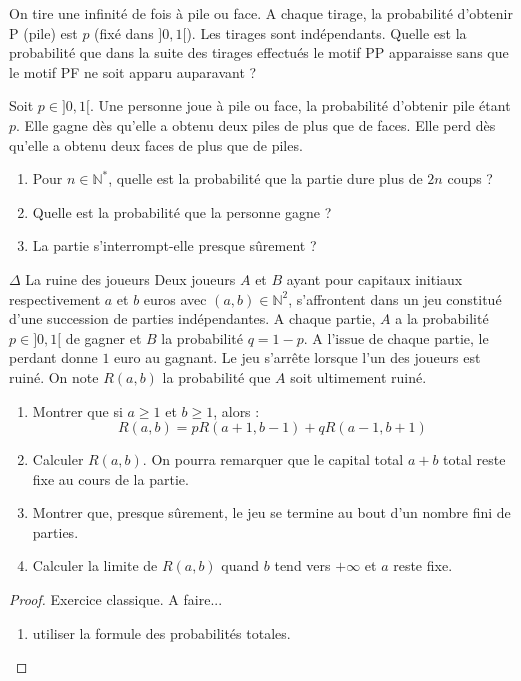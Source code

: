 \documentclass[french,a4paper]{article}
\newcommand{\N}{\mathbb{N}}
\newcommand{\st}{^*}
\theoremstyle{plain}
\theoremstyle{definition}
\theoremstyle{remark}
\begin{document}
\begin{ex}{}
	On tire une infinité de fois à pile ou face. A chaque tirage, la probabilité d'obtenir P (pile) est $p$ (fixé dans $]0,1[$). Les tirages sont indépendants. Quelle est la probabilité que dans la suite des tirages effectués le motif PP apparaisse sans que le motif PF ne soit apparu auparavant ?
\end{ex}

\begin{ex}{}
	Soit $p\in]0,1[$. Une personne joue à pile ou face, la probabilité d'obtenir pile étant $p$. Elle gagne dès qu'elle a obtenu deux piles de plus que de faces. Elle perd dès qu'elle a obtenu deux faces de plus que de piles.
	\begin{enumerate}
		\item Pour $n\in\N\st$, quelle est la probabilité que la partie dure plus de $2n$ coups ?
		\item Quelle est la probabilité que la personne gagne ?
		\item La partie s'interrompt-elle presque sûrement ?
	\end{enumerate}
\end{ex}

\begin{ex}{$\Delta$ La ruine des joueurs}
	Deux joueurs $A$ et $B$ ayant pour capitaux initiaux respectivement $a$ et $b$ euros avec $(a,b)\in\N^2$, s'affrontent dans un jeu constitué d'une succession de parties indépendantes. A chaque partie, $A$ a la probabilité $p\in]0,1[$ de gagner et $B$ la probabilité $q=1-p$. A l'issue de chaque partie, le perdant donne $1$ euro au gagnant. Le jeu s'arrête lorsque l'un des joueurs est ruiné. On note $R(a,b)$ la probabilité que $A$ soit ultimement ruiné.
	\begin{enumerate}
		\item Montrer que si $a\geqslant 1$ et $b\geqslant 1$, alors : $$R(a,b)=pR(a+1,b-1)+qR(a-1,b+1)$$
		\item Calculer $R(a,b)$. On pourra remarquer que le capital total $a+b$ total reste fixe au cours de la partie.
		\item Montrer que, presque sûrement, le jeu se termine au bout d'un nombre fini de parties.
		\item Calculer la limite de $R(a,b)$ quand $b$ tend vers $+\infty$ et $a$ reste fixe.
	\end{enumerate}
\end{ex}
\begin{proof}
	Exercice classique. A faire...
	\begin{enumerate}
		\item utiliser la formule des probabilités totales.
	\end{enumerate}
\end{proof}
\end{document}
